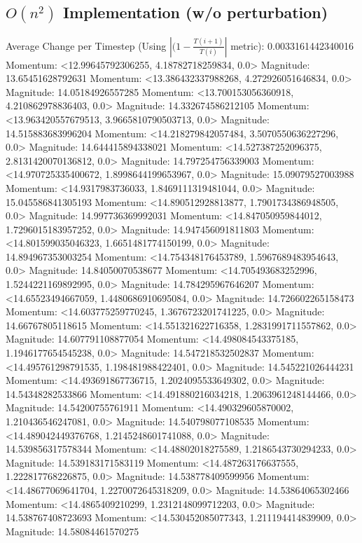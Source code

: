 \documentclass[10pt]{article}
\begin{document}
\subsection{$O(n^2)$ Implementation (w/o perturbation)}
Average Change per Timestep (Using $|(1 - \frac{T(i+1)}{T(i)}|$ metric): 0.0033161442340016
Momentum: <12.99645792306255, 4.18782718259834, 0.0> Magnitude: 13.65451628792631
Momentum: <13.386432337988268, 4.272926051646834, 0.0> Magnitude: 14.05184926557285
Momentum: <13.700153056360918, 4.210862978836403, 0.0> Magnitude: 14.332674586212105
Momentum: <13.963420557679513, 3.9665810790503713, 0.0> Magnitude: 14.515883683996204
Momentum: <14.218279842057484, 3.5070550636227296, 0.0> Magnitude: 14.644415894338021
Momentum: <14.527387252096375, 2.8131420070136812, 0.0> Magnitude: 14.797254756339003
Momentum: <14.970725335400672, 1.8998644199653967, 0.0> Magnitude: 15.09079527003988
Momentum: <14.9317983736033, 1.8469111319481044, 0.0> Magnitude: 15.045586841305193
Momentum: <14.890512928813877, 1.7901734386948505, 0.0> Magnitude: 14.997736369992031
Momentum: <14.847050959844012, 1.7296015183957252, 0.0> Magnitude: 14.947456091811803
Momentum: <14.801599035046323, 1.6651481774150199, 0.0> Magnitude: 14.894967353003254
Momentum: <14.754348176453789, 1.5967689483954643, 0.0> Magnitude: 14.84050070538677
Momentum: <14.705493683252996, 1.5244221169892995, 0.0> Magnitude: 14.784295967646207
Momentum: <14.65523494667059, 1.4480686910695084, 0.0> Magnitude: 14.726602265158473
Momentum: <14.603775259770245, 1.3676723201741225, 0.0> Magnitude: 14.66767805118615
Momentum: <14.551321622716358, 1.2831991711557862, 0.0> Magnitude: 14.607791108877054
Momentum: <14.498084543375185, 1.1946177654545238, 0.0> Magnitude: 14.547218532502837
Momentum: <14.495761298791535, 1.198481988422401, 0.0> Magnitude: 14.545221026444231
Momentum: <14.493691867736715, 1.2024095533649302, 0.0> Magnitude: 14.54348282533866
Momentum: <14.491880216034218, 1.2063961248144466, 0.0> Magnitude: 14.54200755761911
Momentum: <14.490329605870002, 1.210436546247081, 0.0> Magnitude: 14.540798077108535
Momentum: <14.489042449376768, 1.2145248601741088, 0.0> Magnitude: 14.539856317578344
Momentum: <14.48802018275589, 1.2186543730294233, 0.0> Magnitude: 14.539183171583119
Momentum: <14.487263176637555, 1.222817768226875, 0.0> Magnitude: 14.538778409599956
Momentum: <14.48677069641704, 1.2270072645318209, 0.0> Magnitude: 14.53864065302466
Momentum: <14.4865409210299, 1.2312148099712203, 0.0> Magnitude: 14.538767408723693
Momentum: <14.530452085077343, 1.211194414839909, 0.0> Magnitude: 14.58084461570275
\end{document}
